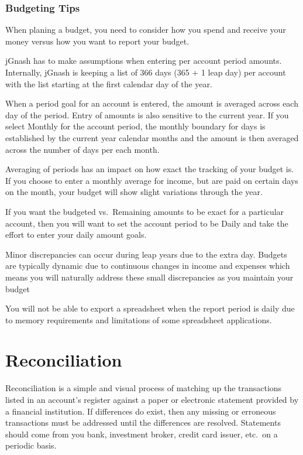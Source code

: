 \documentclass[letterpaper,12pt]{book}
\begin{document}
    \subsection{Budgeting Tips}

    When planing a budget, you need to consider how you spend and receive your money versus how you want to report your budget.

    jGnash has to make assumptions when entering per account period amounts.
    Internally, jGnash is keeping a list of 366 days (365 + 1 leap day) per account with the list starting at the first
    calendar day of the year.

    When a period goal for an account is entered, the amount is averaged across each day of the period.
    Entry of amounts is also sensitive to the current year.
    If you select Monthly for the account period, the monthly boundary for days is established by the current year calendar
    months and the amount is then averaged across the number of days per each month.

    Averaging of periods has an impact on how exact the tracking of your budget is.
    If you choose to enter a monthly average for income, but are paid on certain days on the month, your budget will show
    slight variations through the year.

    If you want the budgeted vs.\ Remaining amounts to be exact for a particular account, then you will want to set the
    account period to be Daily and take the effort to enter your daily amount goals.

    Minor discrepancies can occur during leap years due to the extra day. Budgets are typically dynamic due to continuous
    changes in income and expenses which means you will naturally address these small discrepancies as you maintain your budget

    You will not be able to export a spreadsheet when the report period is daily due to memory requirements and limitations
    of some spreadsheet applications.

    \chapter{Reconciliation}
    Reconciliation is a simple and visual process of matching up the transactions listed in an account's register against a
    paper or electronic statement provided by a financial institution.
    If differences do exist, then any missing or erroneous transactions must be addressed until the differences are resolved.
    Statements should come from you bank, investment broker, credit card issuer, etc.\ on a periodic basis.
\end{document}
